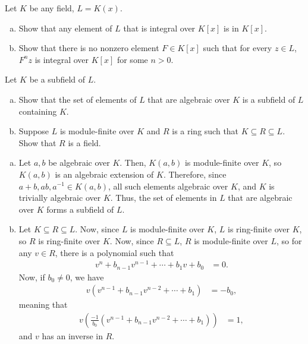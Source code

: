 \documentclass[10pt]{mypackage}
\begin{document}
\begin{exercise}[Exercise 1.49]
  Let $K$ be any field, $L=  K(x)$.
  \begin{enumerate}[(a)]
    \item Show that any element of $L$ that is integral over $K\left[ x \right]$ is in $K\left[ x \right]$.
    \item Show that there is no nonzero element $F\in K\left[ x \right]$ such that for every $z\in L$, $F^{n}z$ is integral over $K\left[ x \right]$ for some $n > 0$.
  \end{enumerate}
\end{exercise}
\begin{exercise}[Exercise 1.50]
  Let $K$ be a subfield of $L$.
  \begin{enumerate}[(a)]
    \item Show that the set of elements of $L$ that are algebraic over $K$ is a subfield of $L$ containing $K$.
    \item Suppose $L$ is module-finite over $K$ and $R$ is a ring such that $K\subseteq R\subseteq L$. Show that $R$ is a field.
  \end{enumerate}
\end{exercise}
\begin{solution}\hfill
  \begin{enumerate}[(a)]
    \item Let $a,b$ be algebraic over $K$. Then, $K\left( a,b \right)$ is module-finite over $K$, so $K\left( a,b \right)$ is an algebraic extension of $K$. Therefore, since $a+b,ab,a^{-1}\in K\left( a,b \right)$, all such elements algebraic over $K$, and $K$ is trivially algebraic over $K$. Thus, the set of elements in $L$ that are algebraic over $K$ forms a subfield of $L$.
    \item Let $K\subseteq R \subseteq L$. Now, since $L$ is module-finite over $K$, $L$ is ring-finite over $K$, so $R$ is ring-finite over $K$. Now, since $R\subseteq L$, $R$ is module-finite over $L$, so for any $v\in R$, there is a polynomial such that
      \begin{align*}
        v^n + b_{n-1}v^{n-1} + \cdots + b_1v + b_0 &= 0.
      \end{align*}
      Now, if $b_0 \neq 0$, we have
      \begin{align*}
        v\left( v^{n-1} + b_{n-1}v^{n-2} + \cdots + b_1 \right) &= -b_0,
      \end{align*}
      meaning that
      \begin{align*}
        v\left( \frac{-1}{b_0}\left( v^{n-1} + b_{n-1}v^{n-2} + \cdots + b_1 \right) \right) &= 1,
      \end{align*}
      and $v$ has an inverse in $R$.
  \end{enumerate}
\end{solution}
\end{document}
